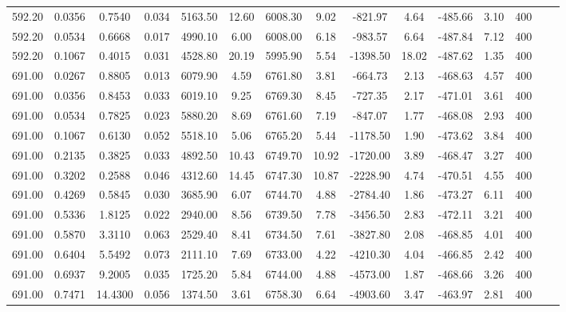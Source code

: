 \documentclass[%
 aip,
 jcp,
 sd,%
 amsmath,amssymb,
]{revtex4-1}
\begin{document}
\begin{table*}[!htbp]
\begin{ruledtabular}
\begin{tabular}{ccccccccccccccc}
592.20	&	0.0356	&	0.7540	&	0.034	&	5163.50	&	12.60	&	6008.30	&	9.02	&	-821.97	&	4.64	&	-485.66	&	3.10	&	400	\\
592.20	&	0.0534	&	0.6668	&	0.017	&	4990.10	&	6.00	&	6008.00	&	6.18	&	-983.57	&	6.64	&	-487.84	&	7.12	&	400	\\
592.20	&	0.1067	&	0.4015	&	0.031	&	4528.80	&	20.19	&	5995.90	&	5.54	&	-1398.50	&	18.02	&	-487.62	&	1.35	&	400	\\
691.00	&	0.0267	&	0.8805	&	0.013	&	6079.90	&	4.59	&	6761.80	&	3.81	&	-664.73	&	2.13	&	-468.63	&	4.57	&	400	\\
691.00	&	0.0356	&	0.8453	&	0.033	&	6019.10	&	9.25	&	6769.30	&	8.45	&	-727.35	&	2.17	&	-471.01	&	3.61	&	400	\\
691.00	&	0.0534	&	0.7825	&	0.023	&	5880.20	&	8.69	&	6761.60	&	7.19	&	-847.07	&	1.77	&	-468.08	&	2.93	&	400	\\
691.00	&	0.1067	&	0.6130	&	0.052	&	5518.10	&	5.06	&	6765.20	&	5.44	&	-1178.50	&	1.90	&	-473.62	&	3.84	&	400	\\
691.00	&	0.2135	&	0.3825	&	0.033	&	4892.50	&	10.43	&	6749.70	&	10.92	&	-1720.00	&	3.89	&	-468.47	&	3.27	&	400	\\
691.00	&	0.3202	&	0.2588	&	0.046	&	4312.60	&	14.45	&	6747.30	&	10.87	&	-2228.90	&	4.74	&	-470.51	&	4.55	&	400	\\
691.00	&	0.4269	&	0.5845	&	0.030	&	3685.90	&	6.07	&	6744.70	&	4.88	&	-2784.40	&	1.86	&	-473.27	&	6.11	&	400	\\
691.00	&	0.5336	&	1.8125	&	0.022	&	2940.00	&	8.56	&	6739.50	&	7.78	&	-3456.50	&	2.83	&	-472.11	&	3.21	&	400	\\
691.00	&	0.5870	&	3.3110	&	0.063	&	2529.40	&	8.41	&	6734.50	&	7.61	&	-3827.80	&	2.08	&	-468.85	&	4.01	&	400	\\
691.00	&	0.6404	&	5.5492	&	0.073	&	2111.10	&	7.69	&	6733.00	&	4.22	&	-4210.30	&	4.04	&	-466.85	&	2.42	&	400	\\
691.00	&	0.6937	&	9.2005	&	0.035	&	1725.20	&	5.84	&	6744.00	&	4.88	&	-4573.00	&	1.87	&	-468.66	&	3.26	&	400	\\
691.00	&	0.7471	&	14.4300	&	0.056	&	1374.50	&	3.61	&	6758.30	&	6.64	&	-4903.60	&	3.47	&	-463.97	&	2.81	&	400	\\
\end{tabular}
\end{ruledtabular}
\end{table*}
\end{document}
